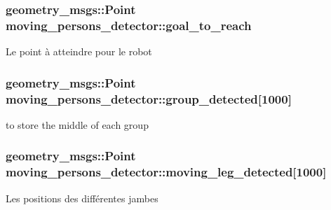 \subsubsection[{\texorpdfstring{goal\+\_\+to\+\_\+reach}{goal_to_reach}}]{\setlength{\rightskip}{0pt plus 5cm}geometry\+\_\+msgs\+::\+Point moving\+\_\+persons\+\_\+detector\+::goal\+\_\+to\+\_\+reach\hspace{0.3cm}{\ttfamily [private]}}\hypertarget{classmoving__persons__detector_af718cc27ac29e0ca034fbafe542cf23c}{}\label{classmoving__persons__detector_af718cc27ac29e0ca034fbafe542cf23c}
Le point à atteindre pour le robot 
\subsubsection[{\texorpdfstring{group\+\_\+detected}{group_detected}}]{\setlength{\rightskip}{0pt plus 5cm}geometry\+\_\+msgs\+::\+Point moving\+\_\+persons\+\_\+detector\+::group\+\_\+detected\mbox{[}1000\mbox{]}\hspace{0.3cm}{\ttfamily [private]}}\hypertarget{classmoving__persons__detector_a40e04cd6cda49ccc016b5881d048c46a}{}\label{classmoving__persons__detector_a40e04cd6cda49ccc016b5881d048c46a}
to store the middle of each group 
\subsubsection[{\texorpdfstring{moving\+\_\+leg\+\_\+detected}{moving_leg_detected}}]{\setlength{\rightskip}{0pt plus 5cm}geometry\+\_\+msgs\+::\+Point moving\+\_\+persons\+\_\+detector\+::moving\+\_\+leg\+\_\+detected\mbox{[}1000\mbox{]}\hspace{0.3cm}{\ttfamily [private]}}\hypertarget{classmoving__persons__detector_a412141d71e00568c403f083c9c7b5410}{}\label{classmoving__persons__detector_a412141d71e00568c403f083c9c7b5410}
Les positions des différentes jambes 
